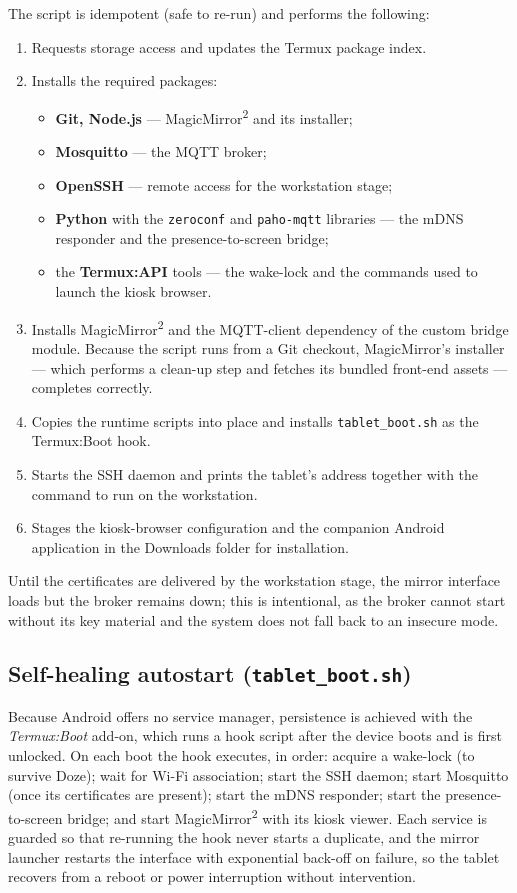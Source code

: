 The script is idempotent (safe to re-run) and performs the following:
\begin{enumerate}
  \item Requests storage access and updates the Termux package index.
  \item Installs the required packages:
    \begin{itemize}
      \item \textbf{Git, Node.js} --- MagicMirror\textsuperscript{2} and its installer;
      \item \textbf{Mosquitto} --- the MQTT broker;
      \item \textbf{OpenSSH} --- remote access for the workstation stage;
      \item \textbf{Python} with the \texttt{zeroconf} and \texttt{paho-mqtt}
            libraries --- the mDNS responder and the presence-to-screen bridge;
      \item the \textbf{Termux:API} tools --- the wake-lock and the commands used
            to launch the kiosk browser.
    \end{itemize}
  \item Installs MagicMirror\textsuperscript{2} and the MQTT-client dependency of
        the custom bridge module. Because the script runs from a Git checkout,
        MagicMirror's installer --- which performs a clean-up step and fetches its
        bundled front-end assets --- completes correctly.
  \item Copies the runtime scripts into place and installs \texttt{tablet\_boot.sh}
        as the Termux:Boot hook.
  \item Starts the SSH daemon and prints the tablet's address together with the
        command to run on the workstation.
  \item Stages the kiosk-browser configuration and the companion Android
        application in the Downloads folder for installation.
\end{enumerate}
Until the certificates are delivered by the workstation stage, the mirror interface
loads but the broker remains down; this is intentional, as the broker cannot start
without its key material and the system does not fall back to an insecure mode.

\subsection{Self-healing autostart (\texttt{tablet\_boot.sh})}

Because Android offers no service manager, persistence is achieved with the
\emph{Termux:Boot} add-on, which runs a hook script after the device boots and is
first unlocked. On each boot the hook executes, in order: acquire a wake-lock (to
survive Doze); wait for Wi-Fi association; start the SSH daemon; start Mosquitto
(once its certificates are present); start the mDNS responder; start the
presence-to-screen bridge; and start MagicMirror\textsuperscript{2} with its kiosk
viewer. Each service is guarded so that re-running the hook never starts a
duplicate, and the mirror launcher restarts the interface with exponential back-off
on failure, so the tablet recovers from a reboot or power interruption without
intervention.

